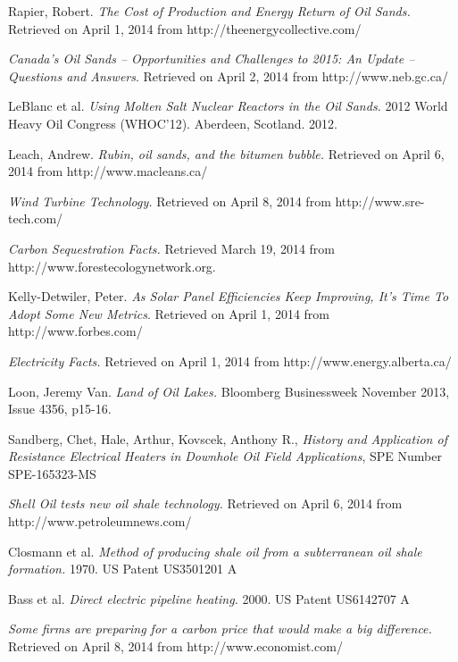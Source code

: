 \documentclass[11pt]{article}
\begin{document}
\begin{thebibliography}{9}
Rapier, Robert.  \emph{The Cost of Production and Energy Return of Oil Sands.} Retrieved on April 1, 2014 from http://theenergycollective.com/

 \emph{Canada’s Oil Sands – Opportunities and Challenges to 2015: An Update – Questions and Answers}. Retrieved on April 2, 2014 from http://www.neb.gc.ca/ 

LeBlanc et al.  \emph{Using Molten Salt Nuclear Reactors in the Oil Sands.} 2012 World Heavy Oil Congress (WHOC’12). Aberdeen, Scotland. 2012. 

Leach, Andrew.  \emph{Rubin, oil sands, and the bitumen bubble.} Retrieved on April 6, 2014 from http://www.macleans.ca/ 

 \emph{Wind Turbine Technology.} Retrieved on April 8, 2014 from http://www.sre-tech.com/

 \emph{Carbon Sequestration Facts.} Retrieved March 19, 2014 from http://www.forestecologynetwork.org.

Kelly-Detwiler, Peter.  \emph{As Solar Panel Efficiencies Keep Improving, It's Time To Adopt Some New Metrics}. Retrieved on April 1, 2014 from http://www.forbes.com/ 

 \emph{Electricity Facts.} Retrieved on April 1, 2014 from http://www.energy.alberta.ca/ 

Loon, Jeremy Van.  \emph{ Land of Oil Lakes.} Bloomberg Businessweek November 2013, Issue 4356, p15-16.

Sandberg, Chet, Hale, Arthur, Kovscek, Anthony R.,  \emph{History and Application of Resistance Electrical Heaters in Downhole Oil Field Applications}, SPE Number SPE-165323-MS

 \emph{Shell Oil tests new oil shale technology.} Retrieved on April 6, 2014 from http://www.petroleumnews.com/ 

Closmann et al.  \emph{Method of producing shale oil from a subterranean oil shale formation.} 1970. US Patent US3501201 A

Bass et al.  \emph{Direct electric pipeline heating.} 2000. US Patent US6142707 A

 \emph{Some firms are preparing for a carbon price that would make a big difference.} Retrieved on April 8, 2014 from http://www.economist.com/


\end{thebibliography}
\end{document}
